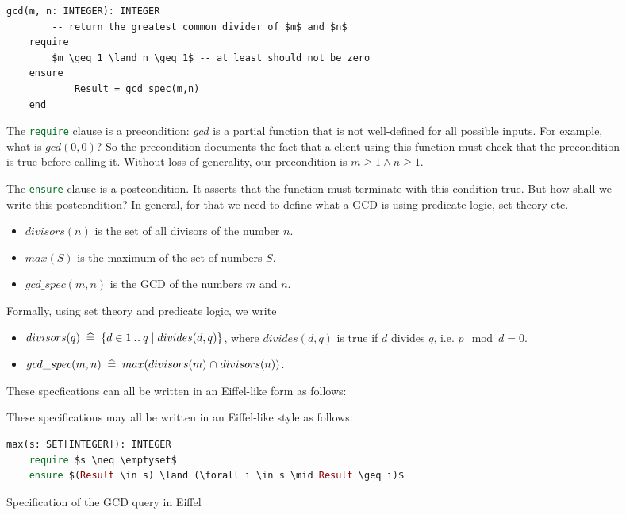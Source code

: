 \documentclass[runningheads,12pt]{article}
\newcommand{\e}[1]{\lstinline[language=eiffel]|#1|}
\begin{document}
\begin{figure}[!htb]
\begin{framed}
\lstset{language=eiffel}    
\begin{lstlisting} 
gcd(m, n: INTEGER): INTEGER
		-- return the greatest common divider of $m$ and $n$
	require
		$m \geq 1 \land n \geq 1$ -- at least should not be zero
	ensure 
			Result = gcd_spec(m,n)
	end
\end{lstlisting}
\end{framed}


The \e{require} clause is a precondition: $gcd$ is a partial function that is not well-defined for all possible inputs. For example, what is $gcd(0,0)$? So the precondition documents the fact that a client using this function must check that the precondition is true before calling it. Without loss of generality, our precondition is $m \geq 1 \land n \geq 1$.

\smallskip
The \e{ensure} clause is a postcondition. It asserts that the function must terminate with this condition true. But how shall we write this postcondition? In general, for that we need to define what a GCD is using predicate logic, set theory etc.

\begin{itemize}
  \item $divisors(n)$ is the set of all divisors of the number $n$. 
  \item $max(S)$ is the maximum of the set of numbers $S$. 
  \item $gcd\_spec(m,n)$ is the GCD of the numbers $m$ and $n$.
\end{itemize}

Formally, using set theory and predicate logic, we write

\begin{itemize}
  \item $divisors(q) \;\mathrel{\widehat=}\; \{d \in 1 \mathbin{.\mkern1mu.} q \mid divides(d, q)\}$, where $divides(d, q)$ is true if $d$ divides $q$, i.e. $p \mod d = 0$. 
  \item $gcd\_spec(m,n) \;\mathrel{\widehat=}\; max(divisors(m) \mathbin{\mkern1mu\cap\mkern1mu} divisors(n))$.
\end{itemize}

These specfications can all be written in an Eiffel-like form as follows:

\begin{framed}
	These specifications may all be written in an Eiffel-like style as follows:
\begin{lstlisting}[language=eiffel]
max(s: SET[INTEGER]): INTEGER
	require $s \neq \emptyset$
	ensure $(Result \in s) \land (\forall i \in s \mid Result \geq i)$
\end{lstlisting}
\end{framed}
	
\caption{Specification of the GCD query in Eiffel}
\label{fig:gcd-spec}
\end{figure}
\end{document}
